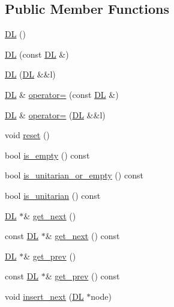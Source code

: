 \subsection*{Public Member Functions}
\begin{DoxyCompactItemize}
\item 
\hyperlink{class_designar_1_1_d_l_a1e17a6036b4e5325d5aeb6641074ee14}{DL} ()
\item 
\hyperlink{class_designar_1_1_d_l_a4caafdd81bc08bdb7d42cbcbe735f59f}{DL} (const \hyperlink{class_designar_1_1_d_l}{DL} \&)
\item 
\hyperlink{class_designar_1_1_d_l_a4a9a38fbd77259a4af54dcd5017fce76}{DL} (\hyperlink{class_designar_1_1_d_l}{DL} \&\&l)
\item 
\hyperlink{class_designar_1_1_d_l}{DL} \& \hyperlink{class_designar_1_1_d_l_a7eb7d13fee4174fa5f4166722316530d}{operator=} (const \hyperlink{class_designar_1_1_d_l}{DL} \&)
\item 
\hyperlink{class_designar_1_1_d_l}{DL} \& \hyperlink{class_designar_1_1_d_l_adc892f364736bab874a6a739e88b5c60}{operator=} (\hyperlink{class_designar_1_1_d_l}{DL} \&\&l)
\item 
void \hyperlink{class_designar_1_1_d_l_a859e63ccad5bfe211d1fd7396f871091}{reset} ()
\item 
bool \hyperlink{class_designar_1_1_d_l_a01d421aa787edb4087c1b2c266554ca5}{is\+\_\+empty} () const
\item 
bool \hyperlink{class_designar_1_1_d_l_aae41f00b718a0fe8bed1be458b2dffac}{is\+\_\+unitarian\+\_\+or\+\_\+empty} () const
\item 
bool \hyperlink{class_designar_1_1_d_l_a262dfc0edc2656658f89b39ee272fac6}{is\+\_\+unitarian} () const
\item 
\hyperlink{class_designar_1_1_d_l}{DL} $\ast$\& \hyperlink{class_designar_1_1_d_l_a9ba5385743ae2c266ea51dcb05f79803}{get\+\_\+next} ()
\item 
const \hyperlink{class_designar_1_1_d_l}{DL} $\ast$\& \hyperlink{class_designar_1_1_d_l_ad95ed8f7db042ad4f537b335e8b77772}{get\+\_\+next} () const
\item 
\hyperlink{class_designar_1_1_d_l}{DL} $\ast$\& \hyperlink{class_designar_1_1_d_l_a479355d41d2d7085b33342a14c0ca514}{get\+\_\+prev} ()
\item 
const \hyperlink{class_designar_1_1_d_l}{DL} $\ast$\& \hyperlink{class_designar_1_1_d_l_a2f7ae6156dd09a783b6d1fc726af47c0}{get\+\_\+prev} () const
\item 
void \hyperlink{class_designar_1_1_d_l_a668fa2d4441cdbdba8640fbdab1b220c}{insert\+\_\+next} (\hyperlink{class_designar_1_1_d_l}{DL} $\ast$node)

\end{DoxyCompactItemize}

